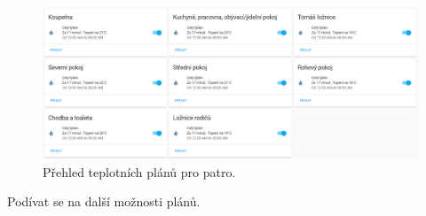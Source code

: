\begin{figure}[H]
    \centering
    \includegraphics[width=\textwidth]{images/software-ha/teplotni-plany-prehled-ha.png}
    \caption{Přehled teplotních plánů pro patro.}
    \label{fig:teplotni-plany-prehled-ha}
\end{figure}

Podívat se na další možnosti plánů.






